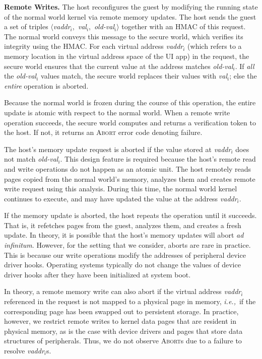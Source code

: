 \documentclass[pageno]{sig-alternate-05-2015}
\newcommand{\myparagraph}[1]{\indent\par\noindent\textsf{\textbf{#1.}}}
\newcommand{\ie}{\textit{i.e.,}}
\begin{document}
\myparagraph{Remote Writes}
%
The host reconfigures the guest by modifying the running state of the normal
world kernel via remote memory updates. The host sends the guest a set of
triples
$\langle$\textit{vaddr}$_i$,~\textit{val}$_i$,~\textit{old-val}$_i$$\rangle$
together with an HMAC of this request. The normal world conveys this message to
the secure world, which verifies its integrity using the HMAC.  For each
virtual address \textit{vaddr}$_i$ (which refers to a memory location in the
virtual address space of the UI app) in the request, the secure world ensures
that the current value at the address matches \textit{old-val}$_i$. If
\textit{all} the \textit{old-val}$_i$ values match, the secure world replaces
their values with \textit{val}$_i$; else the \textit{entire} operation is
aborted.

Because the normal world is frozen during the course of this operation, the
entire update is atomic with respect to the normal world. When a remote write
operation succeeds, the secure world computes and returns a verification token
to the host. If not, it returns an \textsc{Abort} error code denoting failure.

The host's memory update request is aborted if the value stored at
\textit{vaddr}$_i$ does not match \textit{old-val}$_i$.  This design feature is
required because the host's remote read and write operations do not happen as
an atomic unit. The host remotely reads pages copied from the normal world's
memory, analyzes them and creates remote write request using this analysis.
During this time, the normal world kernel continues to execute, and may have
updated the value at the address \textit{vaddr}$_i$.

If the memory update is aborted, the host repeats the operation until it
succeeds. That is, it refetches pages from the guest, analyzes them, and
creates a fresh update. In theory, it is possible that the host's memory
updates will abort \textit{ad infinitum}. However, for the setting that we
consider, aborts are rare in practice. This is because our
write operations modify the addresses of peripheral device driver hooks.
Operating systems typically do not change the values of device driver hooks
after they have been initialized at system boot. 

In theory, a remote memory write can also abort if the virtual address
\textit{vaddr}$_i$ referenced in the request is not mapped to a physical page
in memory, \ie~if the corresponding page has been swapped out to persistent
storage. In practice, however, we restrict remote writes to kernel data pages
that are resident in physical memory, as is the case with device drivers and
pages that store data structures of peripherals. Thus, we do not observe
\textsc{Abort}s due to a failure to resolve \textit{vaddr}$_i$s.
\end{document}
